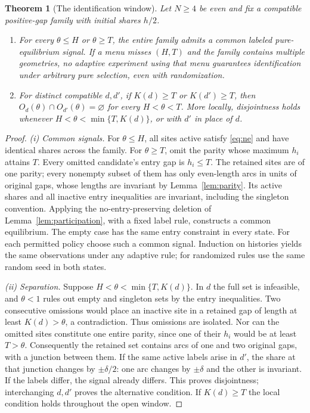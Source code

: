 \documentclass[11pt]{article}
\newtheorem{theorem}{Theorem}
\begin{document}
\begin{theorem}[The identification window]\label{thm:window}
Let $N\geq4$ be even and fix a compatible positive-gap family with initial shares $h/2$.
\begin{enumerate}
\renewcommand{\labelenumi}{(\roman{enumi})}
\item For every $\theta\leq H$ or $\theta\geq T$, the entire family admits a common labeled pure-equilibrium signal. If a menu misses $(H,T)$ and the family contains multiple geometries, no adaptive experiment using that menu guarantees identification under arbitrary pure selection, even with randomization.
\item For distinct compatible $d,d'$, if $K(d)\geq T$ or $K(d')\geq T$, then $O_d(\theta)\cap O_{d'}(\theta)=\varnothing$ for every $H<\theta<T$. More locally, disjointness holds whenever $H<\theta<\min\{T,K(d)\}$, or with $d'$ in place of $d$.
\end{enumerate}
\end{theorem}
\begin{proof}
\emph{(i) Common signals.} For $\theta\leq H$, all sites active satisfy \eqref{eq:ne} and have identical shares across the family. For $\theta\geq T$, omit the parity whose maximum $h_i$ attains $T$. Every omitted candidate's entry gap is $h_i\leq T$. The retained sites are of one parity; every nonempty subset of them has only even-length arcs in units of original gaps, whose lengths are invariant by Lemma~\ref{lem:parity}. Its active shares and all inactive entry inequalities are invariant, including the singleton convention. Applying the no-entry-preserving deletion of Lemma~\ref{lem:participation}, with a fixed label rule, constructs a common equilibrium. The empty case has the same entry constraint in every state. For each permitted policy choose such a common signal. Induction on histories yields the same observations under any adaptive rule; for randomized rules use the same random seed in both states.

\emph{(ii) Separation.} Suppose $H<\theta<\min\{T,K(d)\}$. In $d$ the full set is infeasible, and $\theta<1$ rules out empty and singleton sets by the entry inequalities. Two consecutive omissions would place an inactive site in a retained gap of length at least $K(d)>\theta$, a contradiction. Thus omissions are isolated. Nor can the omitted sites constitute one entire parity, since one of their $h_i$ would be at least $T>\theta$. Consequently the retained set contains arcs of one and two original gaps, with a junction between them. If the same active labels arise in $d'$, the share at that junction changes by $\pm\delta/2$: one arc changes by $\pm\delta$ and the other is invariant. If the labels differ, the signal already differs. This proves disjointness; interchanging $d,d'$ proves the alternative condition. If $K(d)\geq T$ the local condition holds throughout the open window.
\end{proof}
\end{document}
